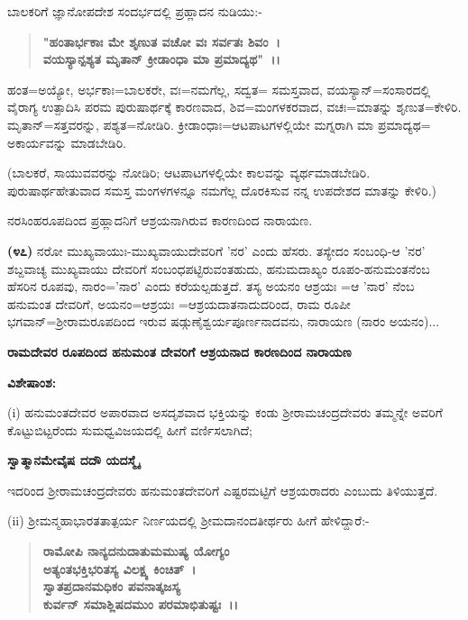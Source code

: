 ಬಾಲಕರಿಗೆ ಜ್ಞಾನೋಪದೇಶ ಸಂದರ್ಭದಲ್ಲಿ ಪ್ರಹ್ಲಾದನ ನುಡಿಯು:-

\begin{verse}
\textbf{"ಹಂತಾರ್ಭಕಾಃ ಮೇ ಶೃಣುತ ವಚೋ ವಃ ಸರ್ವತಃ ಶಿವಂ~।}\\\textbf{ವಯಸ್ಯಾನ್ಪಶ್ಯತ ಮೃತಾನ್ ಕ್ರೀಡಾಂಧಾ ಮಾ ಪ್ರಮಾದ್ಯಥ"~।।}
\end{verse}

ಹಂತ=ಅಯ್ಯೋ, ಅರ್ಭಕಾಃ=ಬಾಲಕರೇ, ವಃ=ನಮಗೆಲ್ಲ, ಸದ್ವತ= ಸಮಸ್ತವಾದ, ವಯಸ್ಯಾನ್=ಸಂಸಾರದಲ್ಲಿ ವೈರಾಗ್ಯ ಉತ್ಪಾದಿಸಿ ಪರಮ ಪುರುಷಾರ್ಥಕ್ಕೆ ಕಾರಣವಾದ, ಶಿವ=ಮಂಗಳಕರವಾದ, ವಚಃ=ಮಾತನ್ನು ಶೃಣುತ=ಕೇಳಿರಿ. ಮೃತಾನ್=ಸತ್ತವರನ್ನು, ಪಶ್ಯತ=ನೋಡಿರಿ. ಕ್ರೀಡಾಂಧಾಃ=ಆಟಪಾಟಗಳಲ್ಲಿಯೇ ಮಗ್ನರಾಗಿ ಮಾ ಪ್ರಮಾದ್ಯಥ= ಅಕಾರ್ಯವನ್ನು ಮಾಡಬೇಡಿರಿ.

(ಬಾಲಕರೆ, ಸಾಯುವವರನ್ನು ನೋಡಿರಿ; ಆಟಪಾಟಗಳಲ್ಲಿಯೇ ಕಾಲವನ್ನು ವ್ಯರ್ಥಮಾಡಬೇಡಿರಿ. ಪುರುಷಾರ್ಥಹೇತುವಾದ ಸಮಸ್ತ ಮಂಗಳಗಳನ್ನೂ ನಮಗೆಲ್ಲ ದೊರಕಿಸುವ ನನ್ನ ಉಪದೇಶದ ಮಾತನ್ನು ಕೇಳಿರಿ.)

ನರಸಿಂಹರೂಪದಿಂದ ಪ್ರಹ್ಲಾದನಿಗೆ ಆಶ್ರಯನಾಗಿರುವ ಕಾರಣದಿಂದ ನಾರಾಯಣ.

\textbf{(೪೭)} ನರೋ ಮುಖ್ಯವಾಯುಃ-ಮುಖ್ಯವಾಯುದೇವರಿಗೆ 'ನರ' ಎಂದು ಹೆಸರು. ತಸ್ಯೇದಂ ಸಂಬಂಧಿ-ಆ 'ನರ' ಶಬ್ದವಾಚ್ಯ ಮುಖ್ಯವಾಯು ದೇವರಿಗೆ ಸಂಬಂಧಪಟ್ಟಿರು\-ವಂತಹುದು, ಹನುಮದಾಖ್ಯಂ ರೂಪಂ-ಹನುಮಂತನೆಂಬ ಹೆಸರಿನ ರೂಪವು, ನಾರಂ='ನಾರ' ಎಂದು ಕರೆಯಲ್ಪಡುತ್ತದೆ. ತಸ್ಯ ಅಯನಂ ಆಶ್ರಯಃ =ಆ 'ನಾರ' ನೆಂಬ ಹನುಮಂತ ದೇವರಿಗೆ, ಅಯನಂ=ಆಶ್ರಯಃ =ಆಶ್ರಯದಾತನಾದುದರಿಂದ, ರಾಮ ರೂಪೀ ಭಗವಾನ್=ಶ‍್ರೀರಾಮರೂಪದಿಂದ ಇರುವ ಷಡ್ಗುಣೈಶ್ವರ್ಯಪೂರ್ಣನಾದವನು, ನಾರಾಯಣ (ನಾರಂ ಅಯನಂ)...

\begin{center}
\textbf{ರಾಮದೇವರ ರೂಪದಿಂದ ಹನುಮಂತ ದೇವರಿಗೆ ಆಶ್ರಯನಾದ ಕಾರಣದಿಂದ ನಾರಾಯಣ}
\end{center}

\noindent
\textbf{ವಿಶೇಷಾಂಶ:\enginline{-}}

(i) ಹನುಮಂತದೇವರ ಅಪಾರವಾದ ಅಸದೃಶವಾದ ಭಕ್ತಿಯನ್ನು ಕಂಡು ಶ‍್ರೀರಾಮಚಂದ್ರ\-ದೇವರು ತಮ್ಮನ್ನೇ ಅವರಿಗೆ ಕೊಟ್ಟುಬಿಟ್ಟರೆಂದು ಸುಮಧ್ವವಿಜಯದಲ್ಲಿ ಹೀಗೆ ವರ್ಣಿಸಲಾಗಿದೆ;

\begin{center}
\textbf{ಸ್ವಾತ್ಮಾನಮೇವೈಷ ದದೌ ಯದಸ್ಮೈ}
\end{center}

\noindent
ಇದರಿಂದ ಶ‍್ರೀರಾಮಚಂದ್ರದೇವರು ಹನುಮಂತದೇವರಿಗೆ ಎಷ್ಟರಮಟ್ಟಿಗೆ ಆಶ್ರಯರಾದರು ಎಂಬುದು ತಿಳಿಯುತ್ತದೆ.

(ii) ಶ‍್ರೀಮನ್ಮಹಾಭಾರತತಾತ್ಪರ್ಯ ನಿರ್ಣಯದಲ್ಲಿ ಶ‍್ರೀಮದಾನಂದತೀರ್ಥರು ಹೀಗೆ ಹೇಳಿದ್ದಾರೆ:-

\begin{verse}
\textbf{ರಾಮೋಪಿ ನಾನ್ಯದನುದಾತುಮಮುಷ್ಯ ಯೋಗ್ಯಂ}\\\textbf{ಅತ್ಯಂತಭಕ್ತಿಭರಿತಸ್ಯ ವಿಲಕ್ಷ್ಯ ಕಿಂಚಿತ್~।}\\\textbf{ಸ್ವಾತಪ್ರದಾನಮಧಿಕಂ ಪವನಾತ್ಕಜಸ್ಯ}\\\textbf{ಕುರ್ವನ್ ಸಮಾಶ್ಲಿಷದಮುಂ ಪರಮಾಭಿತುಷ್ಟಃ~।।}
\end{verse}

